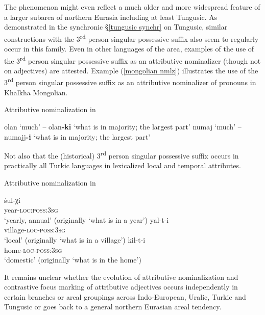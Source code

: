 The phenomenon might even reflect a much older and more widespread feature of a larger subarea of northern Eurasia including at least Tungusic. As demonstrated in the synchronic \S\ref{tungusic synchr} on Tungusic, similar constructions with the 3\textsuperscript{rd} person singular possessive suffix also seem to regularly occur in this family. Even in other languages of the area, examples of the use of the 3\textsuperscript{rd} person singular possessive suffix as an attributive nominalizer (though not on adjectives) are attested. Example (\ref{mongolian nmlz}) illustrates the use of the 3\textsuperscript{rd} person singular possessive suffix as an attributive nominalizer of pronouns in Khalkha Mongolian.
\begin{exe} \label{mongolian nmlz}
\ex \rm{Attributive nominalization in }
\begin{xlist}
\ex	olan ‘much’ – olan\textbf{-ki} ‘what is in majority; the largest part’
\ex	numaj ‘much’ – numajj\textbf{-i} ‘what is in majority; the largest part’
\end{xlist}
\end{exe}
Not also that the (historical) 3\textsuperscript{rd} person singular possessive suffix occurs in practically all Turkic languages in lexicalized local and temporal attributes. 
\begin{exe}
\ex \rm{Attributive nominalization in }
\begin{xlist}
\ex
\gll	śul-χi\\
	year-\textsc{loc:poss:3sg}\\
\glt	‘yearly, annual’ (originally ‘what is in a year’)
\ex
\gll	yal-t-i\\
	village-\textsc{loc-poss:3sg}\\
\glt	‘local’ (originally ‘what is in a village’)
\ex
\gll	kil-t-i\\
	home-\textsc{loc-poss:3sg}\\
\glt	‘domestic’ (originally ‘what is in the home’)
\end{xlist}
\end{exe}
It remains unclear whether the evolution of attributive nominalization and contrastive focus marking of attributive adjectives occurs independently in certain branches or areal groupings across Indo-European, Uralic, Turkic and Tungusic or goes back to a general northern Eurasian areal tendency.

